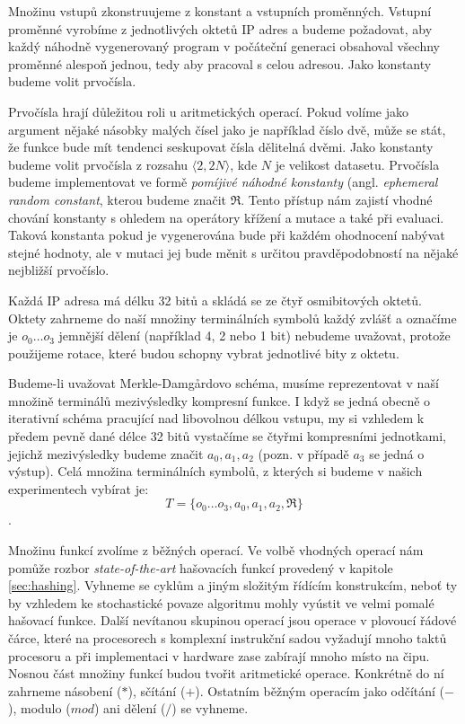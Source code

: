 Množinu vstupů zkonstruujeme z konstant a vstupních proměnných. Vstupní
proměnné vyrobíme z jednotlivých oktetů IP adres a budeme požadovat, aby každý
náhodně vygenerovaný program v počáteční generaci obsahoval všechny proměnné
alespoň jednou, tedy aby pracoval
s celou adresou. Jako konstanty budeme volit prvočísla. 

Prvočísla hrají důležitou roli u aritmetických operací. Pokud volíme jako argument nějaké
násobky malých čísel jako je například číslo dvě, může se stát, že funkce bude
mít tendenci seskupovat čísla dělitelná dvěmi. Jako konstanty budeme volit
prvočísla z rozsahu $\langle 2, 2N \rangle$, kde $N$ je velikost datasetu. Prvočísla
budeme implementovat ve formě \textit{pomíjivé náhodné konstanty} (angl. \textit{ephemeral
random constant}, kterou budeme značit $\Re$. Tento přístup nám
zajistí vhodné chování konstanty s ohledem na operátory křížení a mutace a také při
evaluaci. Taková konstanta pokud je vygenerována bude při každém ohodnocení 
nabývat stejné hodnoty, ale v mutaci jej bude měnit s určitou pravděpodobností na
nějaké nejbližší prvočíslo. 

Každá IP adresa má délku 32 bitů a skládá se ze čtyř osmibitových oktetů. Oktety zahrneme
do naší množiny terminálních symbolů každý zvlášť a označíme je $o_0 \ldots o_3$ jemnější 
dělení (například 4, 2 nebo 1 bit) nebudeme uvažovat, protože použijeme rotace,
které budou schopny vybrat jednotlivé bity z oktetu.

Budeme-li uvažovat Merkle-Damg\r{a}rdovo schéma, musíme reprezentovat v naší
množině terminálů mezivýsledky kompresní funkce. I když se jedná obecně o iterativní
schéma pracující nad libovolnou délkou vstupu, my si vzhledem k předem pevně 
dané délce 32 bitů vystačíme se čtyřmi kompresními jednotkami, jejichž mezivýsledky
budeme značit $a_0, a_1, a_2$ (pozn. v případě $a_3 $ se jedná o výstup). Celá množina
terminálních symbolů, z kterých si budeme v našich experimentech vybírat je:
$$ T=\{o_0 \ldots o_3, a_0, a_1, a_2, \Re\}$$.

Množinu funkcí zvolíme z běžných operací. Ve volbě vhodných operací nám pomůže
rozbor \textit{state-of-the-art} hašovacích funkcí provedený v kapitole \ref{sec:hashing}.
Vyhneme se cyklům a jiným složitým
řídícím konstrukcím, neboť ty by vzhledem ke stochastické povaze algoritmu mohly
vyústit ve velmi pomalé hašovací funkce. Další nevítanou skupinou operací jsou operace
v plovoucí řádové čárce, které na procesorech s komplexní instrukční sadou vyžadují
mnoho taktů procesoru a při implementaci v hardware zase zabírají mnoho místo na čipu.
Nosnou část množiny funkcí budou tvořit aritmetické operace. Konkrétně do ní zahrneme
násobení ($*$), sčítání ($+$). Ostatním běžným operacím jako  odčítání ($-$), modulo ($mod$) ani dělení ($/$)
se vyhneme.


